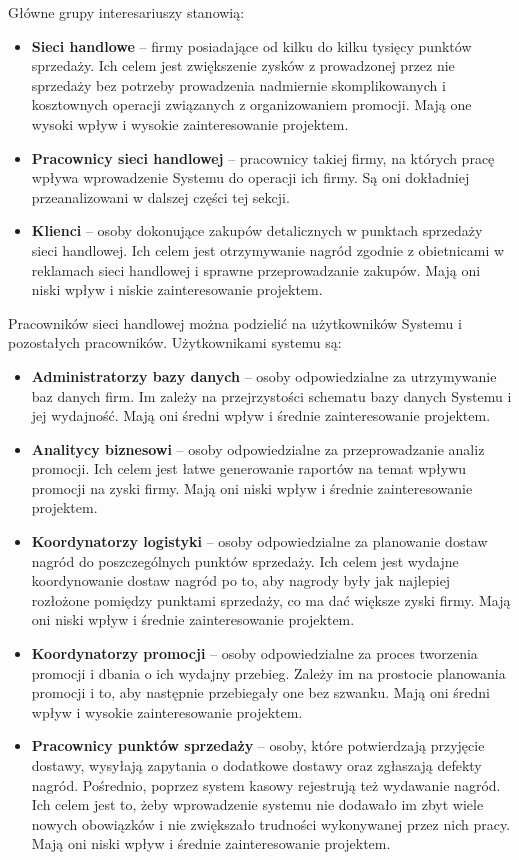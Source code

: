 \documentclass[a4paper,12pt]{article}
\begin{document}
Główne grupy interesariuszy stanowią:
\begin{itemize}
    \item \textbf{Sieci handlowe} -- firmy posiadające od kilku do kilku tysięcy punktów sprzedaży.
    Ich celem jest zwiększenie zysków z prowadzonej przez nie sprzedaży bez potrzeby prowadzenia nadmiernie skomplikowanych i kosztownych operacji związanych z organizowaniem promocji.
    Mają one wysoki wpływ i wysokie zainteresowanie projektem.
    \item \textbf{Pracownicy sieci handlowej} -- pracownicy takiej firmy, na których pracę wpływa wprowadzenie Systemu do operacji ich firmy.
    Są oni dokładniej przeanalizowani w dalszej części tej sekcji.
    \item \textbf{Klienci} -- osoby dokonujące zakupów detalicznych w punktach sprzedaży sieci handlowej.
    Ich celem jest otrzymywanie nagród zgodnie z obietnicami w reklamach sieci handlowej i sprawne przeprowadzanie zakupów.
    Mają oni niski wpływ i niskie zainteresowanie projektem.
\end{itemize}

Pracowników sieci handlowej można podzielić na użytkowników Systemu i pozostałych pracowników.
Użytkownikami systemu są:
\begin{itemize}
    \item \textbf{Administratorzy bazy danych} -- osoby odpowiedzialne za utrzymywanie baz danych firm.
    Im zależy na przejrzystości schematu bazy danych Systemu i jej wydajność.
    Mają oni średni wpływ i średnie zainteresowanie projektem.
    \item \textbf{Analitycy biznesowi} -- osoby odpowiedzialne za przeprowadzanie analiz promocji.
    Ich celem jest łatwe generowanie raportów na temat wpływu promocji na zyski firmy.
    Mają oni niski wpływ i średnie zainteresowanie projektem.
    \item \textbf{Koordynatorzy logistyki} -- osoby odpowiedzialne za planowanie dostaw nagród do poszczególnych punktów sprzedaży.
    Ich celem jest wydajne koordynowanie dostaw nagród po to, aby nagrody były jak najlepiej rozłożone pomiędzy punktami sprzedaży, co ma dać większe zyski firmy.
    Mają oni niski wpływ i średnie zainteresowanie projektem.
    \item \textbf{Koordynatorzy promocji} -- osoby odpowiedzialne za proces tworzenia promocji i dbania o ich wydajny przebieg.
    Zależy im na prostocie planowania promocji i to, aby następnie przebiegały one bez szwanku.
    Mają oni średni wpływ i wysokie zainteresowanie projektem.
    \item \textbf{Pracownicy punktów sprzedaży} -- osoby, które potwierdzają przyjęcie dostawy, wysyłają zapytania o dodatkowe dostawy oraz zgłaszają defekty nagród. Pośrednio, poprzez system kasowy rejestrują też wydawanie nagród.
    Ich celem jest to, żeby wprowadzenie systemu nie dodawało im zbyt wiele nowych obowiązków i nie zwiększało trudności wykonywanej przez nich pracy.
    Mają oni niski wpływ i średnie zainteresowanie projektem.  
\end{itemize}
\end{document}
